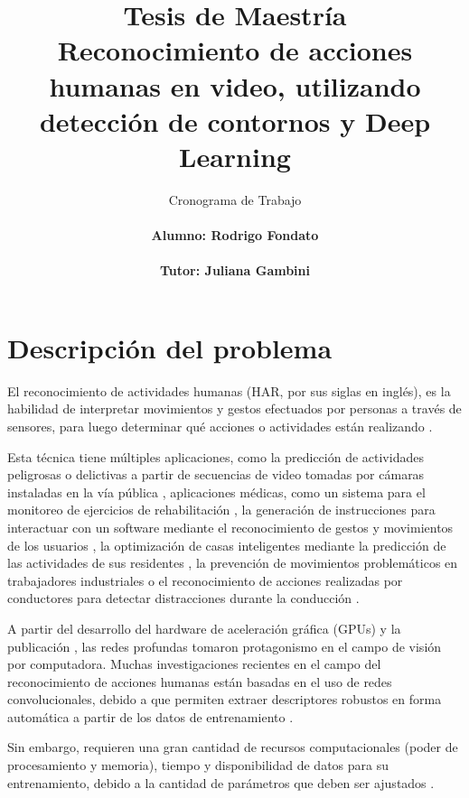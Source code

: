 \documentclass[10pt]{article}
\begin{document}
\title{{\bf Tesis de Maestría}\\ Reconocimiento de acciones humanas en video, utilizando detección de contornos y Deep Learning
}
\author{Cronograma de Trabajo \\
	\ \\
	 \bf{Alumno}: Rodrigo Fondato\\
 \ \\
\bf{Tutor: Juliana Gambini}}
\date{}
\maketitle
	\Large{\textbf{}}
	
\section{Descripción del problema}

El reconocimiento de actividades humanas (HAR, por sus siglas en inglés), es la habilidad de interpretar movimientos y gestos efectuados por personas a través de sensores, para luego determinar qué acciones o actividades están realizando \citep{Ann2014}.

Esta técnica tiene múltiples aplicaciones, como la predicción de actividades peligrosas o delictivas a partir de secuencias de video tomadas por cámaras instaladas en la vía pública \citep{Ryoo2011}, aplicaciones médicas, como un sistema para el monitoreo de ejercicios de rehabilitación \citep{Gonzalez-Ortega2014}, la generación de instrucciones para interactuar con un software mediante el reconocimiento de gestos y movimientos de los usuarios \citep{Gerling2012}, la optimización de casas inteligentes mediante la predicción de las actividades de sus residentes \citep{Mohamed2022}, la prevención de movimientos problemáticos en trabajadores industriales \citep{Fernandes2022} o el reconocimiento de acciones realizadas por conductores para detectar distracciones durante la conducción \citep{lu2020}.

A partir del desarrollo del hardware de aceleración gráfica (GPUs) y la publicación \citep{Krizhevsky2017}, las redes profundas tomaron protagonismo en el campo de visión por computadora. Muchas investigaciones recientes en el campo del reconocimiento de acciones humanas están basadas en el uso de redes convolucionales, debido a que permiten extraer descriptores robustos en forma automática a partir de los datos de entrenamiento \citep{Ji2013, Feichtenhofer2016, Varol2018, Ullah2017, Zhu2019}.

Sin embargo, requieren una gran cantidad de recursos computacionales (poder de procesamiento y memoria), tiempo y disponibilidad de datos para su entrenamiento, debido a la cantidad de parámetros que deben ser ajustados \citep{Li2016}.
\end{document}
